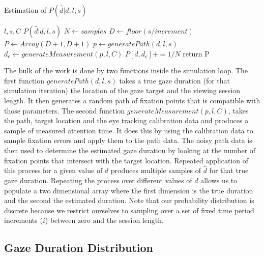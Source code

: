 \documentclass[12pt,a4paper]{article}
\numberwithin{equation}{section}
\begin{document}
\begin{algorithm}
\caption{Estimation of $P(\hat{d}|d,l,s)$}\label{alg:p_of_dhat}
\begin{algorithmic}
  \Require $l,s,C$
  \Ensure $P(\hat{d}|d,l,s)$
  \State $N \gets samples$              
  \State $D \gets floor(s / increment)$ 
  \State $P \gets Array(D+1,D+1)$       
                    
                    
      \State $p \gets generatePath(d,l,s)$
      \State $d_e \gets generateMeasurement(p,l,C)$  
      \State $P[d,d_e] += 1/N$          
    \EndFor
  \EndFor
  \State return P
\end{algorithmic}
\end{algorithm}


The bulk of the work is done by two functions inside the simulation loop. The first function
$generatePath(d,l,s)$ takes a true gaze duration (for that simulation iteration) the location
of the gaze target and the viewing session length. It then
generates a random path of fixation points that is compatible with those parameters.
The second function 
$generateMeasurement(p,l,C)$, takes the path, target location and the eye tracking calibration 
data and produces a sample of measured attention time. It does this by using the calibration data to sample
fixation errors and apply them to the path data. The noisy path data is then used to determine
the estimated gaze duration by looking at the number of fixation points that intersect with the target
location.
Repeated application of this process for a given value of $d$ produces multiple samples of $\hat{d}$
for that true gaze duration. Repeating the process over different 
values of $d$ allows us to populate a two dimensional array where the first dimension is the
true duration and the second the estimated duration. Note that our probability distribution is discrete
because we restrict ourselves to sampling over a set of fixed time period increments ($i$) 
between zero and the session length.

\subsection{Gaze Duration Distribution}
\end{document}
